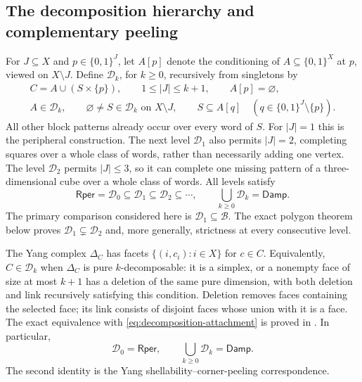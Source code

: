 \documentclass[11pt]{article}
\theoremstyle{definition}
\newcommand{\bits}{\{0,1\}}
\newcommand{\Damp}{\mathsf{Damp}}
\newcommand{\Rper}{\mathsf{Rper}}
\begin{document}
\clearpage


\subsection{The decomposition hierarchy and complementary peeling}\label{sec:intermediate}

For $J\subseteq X$ and $p\in\bits^J$, let $A[p]$ denote the conditioning
of $A\subseteq\bits^X$ at $p$, viewed on $X\setminus J$.
Define $\mathcal D_k$, for $k\ge0$, recursively from singletons by
\begin{equation}\label{eq:decomposition-attachment}
 \begin{gathered}
 C=A\cup(S\times\{p\}),\qquad 1\le |J|\le k+1,\qquad A[p]=\varnothing,\\
 A\in\mathcal D_k,\qquad
 \varnothing\ne S\in\mathcal D_k\text{ on }X\setminus J,\qquad
 S\subseteq A[q]\quad(q\in\bits^J\setminus\{p\}).
 \end{gathered}
\end{equation}
All other block patterns already occur over every word of $S$.
For $|J|=1$ this is the peripheral construction. The next level
$\mathcal D_1$ also permits $|J|=2$, completing squares over a whole
class of words, rather than necessarily adding one vertex. The level
$\mathcal D_2$ permits $|J|\le3$, so it can complete one missing
pattern of a three-dimensional cube over a whole class of words.
All levels satisfy
\[
 \Rper=\mathcal D_0\subseteq\mathcal D_1\subseteq\mathcal D_2
 \subseteq\cdots,\qquad \bigcup_{k\ge0}\mathcal D_k=\Damp.
\]
The primary comparison considered here is $\mathcal D_1\subseteq\mathcal B$.
The exact polygon theorem below proves $\mathcal D_1\subsetneq\mathcal D_2$
and, more generally, strictness at every consecutive level.

The Yang complex $\Delta_C$ has facets $\{(i,c_i):i\in X\}$ for $c\in C$.
Equivalently, $C\in\mathcal D_k$ when $\Delta_C$ is pure
$k$-decomposable: it is a simplex, or a nonempty face of size at most
$k+1$ has a deletion of the same pure dimension, with both deletion and
link recursively satisfying this condition. Deletion removes faces
containing the selected face; its link consists of disjoint faces whose
union with it is a face. The exact equivalence with
\eqref{eq:decomposition-attachment} is proved in \cite{RecursiveClasses}.
In particular,
\[
 \mathcal D_0=\Rper,\qquad \bigcup_{k\ge0}\mathcal D_k=\Damp.
\]
The second identity is the Yang shellability--corner-peeling correspondence.
\end{document}
